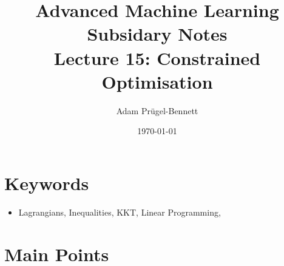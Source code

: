\documentclass[11pt]{article}
\author{Adam Prügel-Bennett}
\date{\today}
\title{Advanced Machine Learning Subsidary Notes\\\medskip
\large Lecture 15: Constrained Optimisation}
\begin{document}
\maketitle

\section{Keywords}
\label{sec:orgefc1759}
\begin{itemize}
\item Lagrangians, Inequalities, KKT, Linear Programming,
\end{itemize}

\section{Main Points}
\label{sec:org81caf33}
\end{document}
